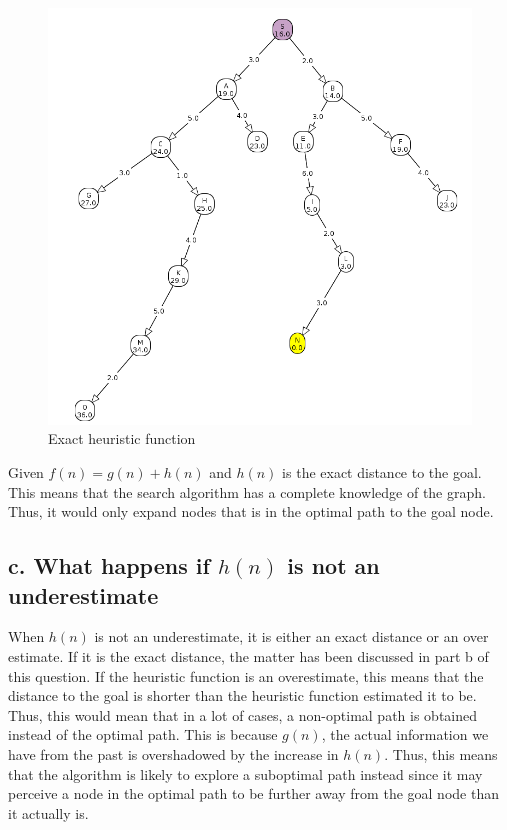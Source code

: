 \documentclass[11pt, A4]{article}
\begin{document}
\begin{figure}[H]
\centering
\includegraphics[width = \textwidth]{./2b.png}
\caption{Exact heuristic function}
\label{fig:2b}
\end{figure}

Given $f(n) = g(n) + h(n)$ and $h(n)$ is the exact distance to the goal. This means that the search algorithm has a complete knowledge of the graph. Thus, it would only expand nodes that is in the optimal path to the goal node.

\subsection*{c. What happens if $h(n)$ is not an underestimate}

When $h(n)$ is not an underestimate, it is either an exact distance or an over estimate. If it is the exact distance, the matter has been discussed in part b of this question. If the heuristic function is an overestimate, this means that the distance to the goal is shorter than the heuristic function estimated it to be. Thus, this would mean that in a lot of cases, a non-optimal path is obtained instead of the optimal path. This is because $g(n)$, the actual information we have from the past is overshadowed by the increase in $h(n)$. Thus, this means that the algorithm is likely to explore a suboptimal path instead since it may perceive a node in the optimal path to be further away from the goal node than it actually is. \\
\end{document}
